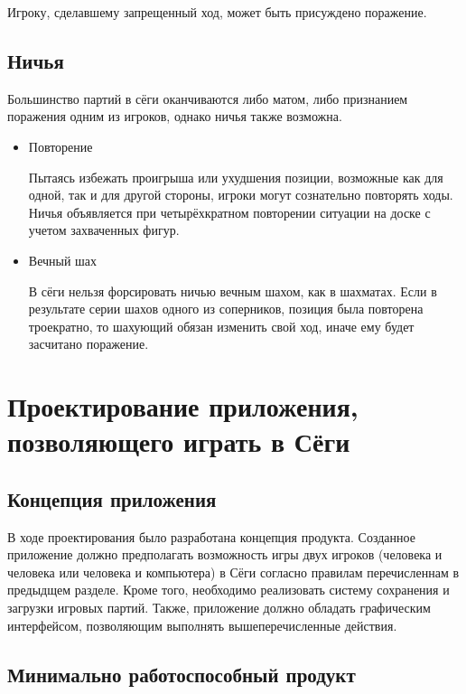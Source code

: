 Игроку, сделавшему запрещенный ход, может быть присуждено поражение.

\subsection{Ничья}

Большинство партий в сёги оканчиваются либо матом, либо признанием поражения одним из игроков, однако ничья также возможна.

\begin{itemize}


	\item Повторение
	
	Пытаясь избежать проигрыша или ухудшения позиции, возможные как для одной, так и для 		другой стороны, игроки могут сознательно повторять ходы. Ничья объявляется при 				четырёхкратном повторении ситуации на доске с учетом захваченных фигур.


	\item Вечный шах

	В сёги нельзя форсировать ничью вечным шахом, как в шахматах. Если в результате серии 		шахов одного из соперников, позиция была повторена троекратно, то шахующий обязан 			изменить свой ход, иначе ему будет засчитано поражение.
   
\end{itemize}


\section{Проектирование приложения, позволяющего играть в Сёги}

\subsection{Концепция приложения} 

В ходе проектирования было разработана концепция продукта.
Созданное приложение должно предполагать возможность игры двух игроков (человека и человека или человека и компьютера) в Сёги согласно правилам перечисленнам в предыдщем разделе. Кроме того, необходимо реализовать систему сохранения и загрузки игровых партий. Также, приложение должно обладать графическим интерфейсом, позволяющим выполнять вышеперечисленные действия.

\subsection{Минимально работоспособный продукт}

